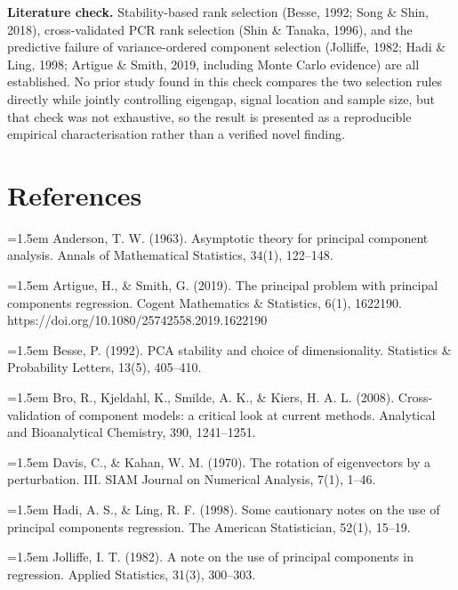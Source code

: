 \documentclass[11pt]{article}
\begin{document}
\textbf{Literature check.} Stability-based rank selection (Besse, 1992; Song \& Shin, 2018), cross-validated PCR rank selection (Shin \& Tanaka, 1996), and the predictive failure of variance-ordered component selection (Jolliffe, 1982; Hadi \& Ling, 1998; Artigue \& Smith, 2019, including Monte Carlo evidence) are all established. No prior study found in this check compares the two selection rules directly while jointly controlling eigengap, signal location and sample size, but that check was not exhaustive, so the result is presented as a reproducible empirical characterisation rather than a verified novel finding.\par

\section*{References}

\hangindent=1.5em Anderson, T. W. (1963). Asymptotic theory for principal component analysis. Annals of Mathematical Statistics, 34(1), 122--148.\par

\hangindent=1.5em Artigue, H., \& Smith, G. (2019). The principal problem with principal components regression. Cogent Mathematics \& Statistics, 6(1), 1622190. https://doi.org/10.1080/25742558.2019.1622190\par

\hangindent=1.5em Besse, P. (1992). PCA stability and choice of dimensionality. Statistics \& Probability Letters, 13(5), 405--410.\par

\hangindent=1.5em Bro, R., Kjeldahl, K., Smilde, A. K., \& Kiers, H. A. L. (2008). Cross-validation of component models: a critical look at current methods. Analytical and Bioanalytical Chemistry, 390, 1241--1251.\par

\hangindent=1.5em Davis, C., \& Kahan, W. M. (1970). The rotation of eigenvectors by a perturbation. III. SIAM Journal on Numerical Analysis, 7(1), 1--46.\par

\hangindent=1.5em Hadi, A. S., \& Ling, R. F. (1998). Some cautionary notes on the use of principal components regression. The American Statistician, 52(1), 15--19.\par

\hangindent=1.5em Jolliffe, I. T. (1982). A note on the use of principal components in regression. Applied Statistics, 31(3), 300--303.\par
\end{document}
